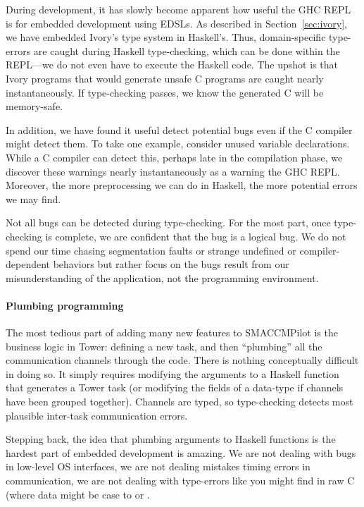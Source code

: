 During development, it has slowly become apparent how useful the GHC REPL is for
embedded development using EDSLs.  As described in Section~\ref{sec:ivory}, we
have embedded Ivory's type system in Haskell's.  Thus, domain-specific
type-errors are caught during Haskell type-checking, which can be done within
the REPL---we do not even have to execute the Haskell code.  The upshot is that
Ivory programs that would generate unsafe C programs are caught nearly
instantaneously.  If type-checking passes, we know the generated C will be
memory-safe.

In addition, we have found it useful detect potential bugs even if the C
compiler might detect them.  To take one example, consider unused variable
declarations.  While a C compiler can detect this, perhaps late in the
compilation phase, we discover these warnings nearly instantaneously as a
warning the GHC REPL.  Moreover, the more preprocessing we can do in Haskell,
the more potential errors we may find.

Not all bugs can be detected during type-checking.  For the most part, once
type-checking is complete, we are confident that the bug is a logical bug.  We
do not spend our time chasing segmentation faults or strange undefined or
compiler-dependent behaviors but rather focus on the bugs result from our
misunderstanding of the application, not the programming environment.

\paragraph{Plumbing programming}
The most tedious part of adding many new features to SMACCMPilot is the business
logic in Tower: defining a new task, and then ``plumbing'' all the communication
channels through the code.  There is nothing conceptually difficult in doing so.
It simply requires modifying the arguments to a Haskell function that generates
a Tower task (or modifying the fields of a data-type if channels have been
grouped together).  Channels are typed, so type-checking detects most plausible
inter-task communication errors.

Stepping back, the idea that plumbing arguments to Haskell functions is the
hardest part of embedded development is amazing.  We are not dealing with bugs
in low-level OS interfaces, we are not dealing mistakes timing errors in
communication, we are not dealing with type-errors like you might find in raw C
(where data might be case to  or .

